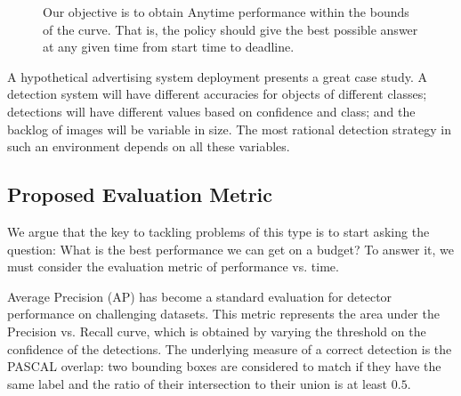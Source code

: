 \begin{figure}[h!]
  \caption{\label{fig:page1}Our objective is to obtain Anytime performance within the bounds of the curve. That is, the policy should give the best possible answer at any given time from start time to deadline.}
\end{figure}

A hypothetical advertising system deployment presents a great case study.
A detection system will have different accuracies for objects of different classes; detections will have different values based on confidence and class; and the backlog of images will be variable in size.
The most rational detection strategy in such an environment depends on all these variables.

\subsection{Proposed Evaluation Metric}\label{sec:evaluation}
We argue that the key to tackling problems of this type is to start asking the question: What is the best performance we can get on a budget?
To answer it, we must consider the evaluation metric of performance vs. time.

Average Precision (AP) has become a standard evaluation for detector performance on challenging datasets.
This metric represents the area under the Precision vs. Recall curve, which is obtained by varying the threshold on the confidence of the detections.
The underlying measure of a correct detection is the PASCAL overlap: two bounding boxes are considered to match if they have the same label and the ratio of their intersection to their union is at least $0.5$.

